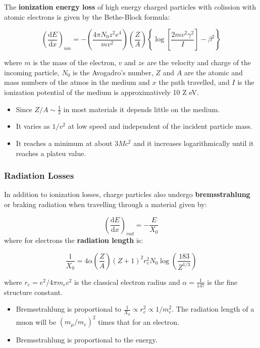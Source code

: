 \documentclass[
  letterpaper,
  DIV=11,
  numbers=noendperiod]{scrreprt}
\providecommand{\tightlist}{%
  \setlength{\itemsep}{0pt}\setlength{\parskip}{0pt}}\usepackage{longtable,booktabs,array}
\begin{document}
The \textbf{ionization energy loss} of high energy charged particles
with colission with atomic electrons is given by the Bethe-Block
formula:

\[\left(\frac{\mathrm{ d} E}{\mathrm{ d} x}\right)_{ion}= -\left(\frac{4\pi N_0z^2e^4}{mv^2}\right)\left(\frac{Z}{A}\right)\left\{\log\left[\frac{2mv^2\gamma^2}{I}\right]-\beta^2\right\}\]

where \(m\) is the mass of the electron, \(v\) and \(ze\) are the
velocity and charge of the incoming particle, \(N_0\) is the Avogadro's
number, \(Z\) and \(A\) are the atomic and mass numbers of the atmos in
the medium and \(x\) the path travelled, and \(I\) is the ionization
potential of the medium is approximatively 10 Z eV.

\begin{itemize}
\tightlist
\item
  Since \(Z/A \sim \frac{1}{2}\) in most materials it depends little on
  the medium.
\item
  It varies as \(1/v^2\) at low speed and independent of the incident
  particle mass.
\item
  It reaches a minimum at about \(3Mc^2\) and it increases
  logarithmically until it reaches a plateu value.
\end{itemize}

\subsubsection*{Radiation Losses}\label{radiation-losses}

In addition to ionization losses, charge particles also undergo
\textbf{bremsstrahlung} or braking radiation when travelling through a
material given by:

\[\left(\frac{\mathrm{ d} E}{\mathrm{ d} x}\right)_{rad} = -\frac{E}{X_0}\]
where for electrons the \textbf{radiation length} is:

\[\frac{1}{X_0} = 4 \alpha\left(\frac{Z}{A}\right)(Z + 1)^2r_e^2N_0\log\left(\frac{183}{Z^{1/3}}\right)\]

where \(r_e = e^2/4\pi m_e c^2\) is the classical electron radius and
\(\alpha = \frac{1}{137}\) is the fine structure constant.

\begin{itemize}
\tightlist
\item
  Bremsstrahlung is proportional to
  \(\frac{1}{X_0} \propto r^2_{e} \propto 1/m_e^2\). The radiation
  length of a muon will be \((m_\mu/m_e)^2\) times that for an electron.
\item
  Bremsstrahlung is proportional to the energy.
\end{itemize}
\end{document}
